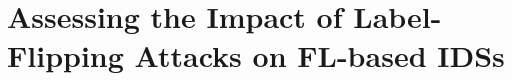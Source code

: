 \chapter{Assessing the Impact of Label-Flipping Attacks on FL-based IDSs\label{chap:assessment}}

\providecommand{\codeurl}{}
\renewcommand{\codeurl}{\url{httos://github.com/TODO}}

\newcommand{\phantomlabel}[1]{%
  \refstepcounter{subfigure}%
  \label{#1}%
}
\newcommand{\phantomlabels}[2]{%
  \foreach \i in {a,...,#2} {%
    \expandafter\phantomlabel{#1.\i}%
  }%
}





